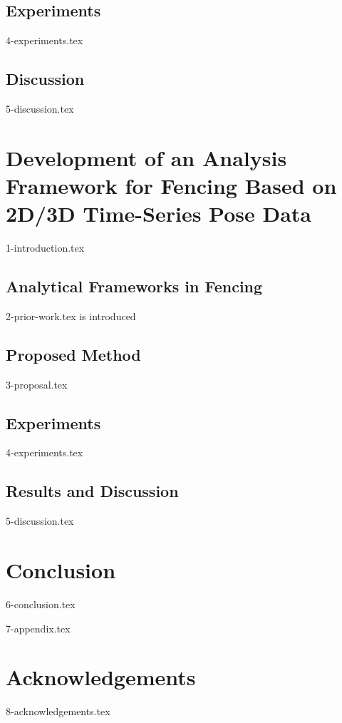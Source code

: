 \documentclass[a4paper,11pt]{report}
\let\oldsection\section
\renewcommand\section{\clearpage\oldsection}
\begin{document}
\section{Experiments}
{4-experiments.tex}

\section{Discussion}
{5-discussion.tex}

\chapter{Development of an Analysis Framework for Fencing Based on 2D/3D Time-Series Pose Data}
{1-introduction.tex}

\section{Analytical Frameworks in Fencing}
{2-prior-work.tex}
is introduced
\section{Proposed Method}
{3-proposal.tex}

\section{Experiments}
{4-experiments.tex}

\section{Results and Discussion}
{5-discussion.tex}

\chapter{Conclusion}
{6-conclusion.tex}

\begin{appendices}
	{7-appendix.tex}
\end{appendices}

\chapter*{Acknowledgements}
{8-acknowledgements.tex}

\newpage

\renewcommand{\bibname}{References}



\end{document}
